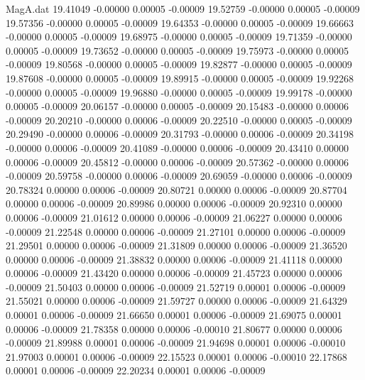 \begin{filecontents}{MagA.dat}
  19.41049   -0.00000    0.00005   -0.00009
  19.52759   -0.00000    0.00005   -0.00009
  19.57356   -0.00000    0.00005   -0.00009
  19.64353   -0.00000    0.00005   -0.00009
  19.66663   -0.00000    0.00005   -0.00009
  19.68975   -0.00000    0.00005   -0.00009
  19.71359   -0.00000    0.00005   -0.00009
  19.73652   -0.00000    0.00005   -0.00009
  19.75973   -0.00000    0.00005   -0.00009
  19.80568   -0.00000    0.00005   -0.00009
  19.82877   -0.00000    0.00005   -0.00009
  19.87608   -0.00000    0.00005   -0.00009
  19.89915   -0.00000    0.00005   -0.00009
  19.92268   -0.00000    0.00005   -0.00009
  19.96880   -0.00000    0.00005   -0.00009
  19.99178   -0.00000    0.00005   -0.00009
  20.06157   -0.00000    0.00005   -0.00009
  20.15483   -0.00000    0.00006   -0.00009
  20.20210   -0.00000    0.00006   -0.00009
  20.22510   -0.00000    0.00005   -0.00009
  20.29490   -0.00000    0.00006   -0.00009
  20.31793   -0.00000    0.00006   -0.00009
  20.34198   -0.00000    0.00006   -0.00009
  20.41089   -0.00000    0.00006   -0.00009
  20.43410    0.00000    0.00006   -0.00009
  20.45812   -0.00000    0.00006   -0.00009
  20.57362   -0.00000    0.00006   -0.00009
  20.59758   -0.00000    0.00006   -0.00009
  20.69059   -0.00000    0.00006   -0.00009
  20.78324    0.00000    0.00006   -0.00009
  20.80721    0.00000    0.00006   -0.00009
  20.87704    0.00000    0.00006   -0.00009
  20.89986    0.00000    0.00006   -0.00009
  20.92310    0.00000    0.00006   -0.00009
  21.01612    0.00000    0.00006   -0.00009
  21.06227    0.00000    0.00006   -0.00009
  21.22548    0.00000    0.00006   -0.00009
  21.27101    0.00000    0.00006   -0.00009
  21.29501    0.00000    0.00006   -0.00009
  21.31809    0.00000    0.00006   -0.00009
  21.36520    0.00000    0.00006   -0.00009
  21.38832    0.00000    0.00006   -0.00009
  21.41118    0.00000    0.00006   -0.00009
  21.43420    0.00000    0.00006   -0.00009
  21.45723    0.00000    0.00006   -0.00009
  21.50403    0.00000    0.00006   -0.00009
  21.52719    0.00001    0.00006   -0.00009
  21.55021    0.00000    0.00006   -0.00009
  21.59727    0.00000    0.00006   -0.00009
  21.64329    0.00001    0.00006   -0.00009
  21.66650    0.00001    0.00006   -0.00009
  21.69075    0.00001    0.00006   -0.00009
  21.78358    0.00000    0.00006   -0.00010
  21.80677    0.00000    0.00006   -0.00009
  21.89988    0.00001    0.00006   -0.00009
  21.94698    0.00001    0.00006   -0.00010
  21.97003    0.00001    0.00006   -0.00009
  22.15523    0.00001    0.00006   -0.00010
  22.17868    0.00001    0.00006   -0.00009
  22.20234    0.00001    0.00006   -0.00009

\end{filecontents}
